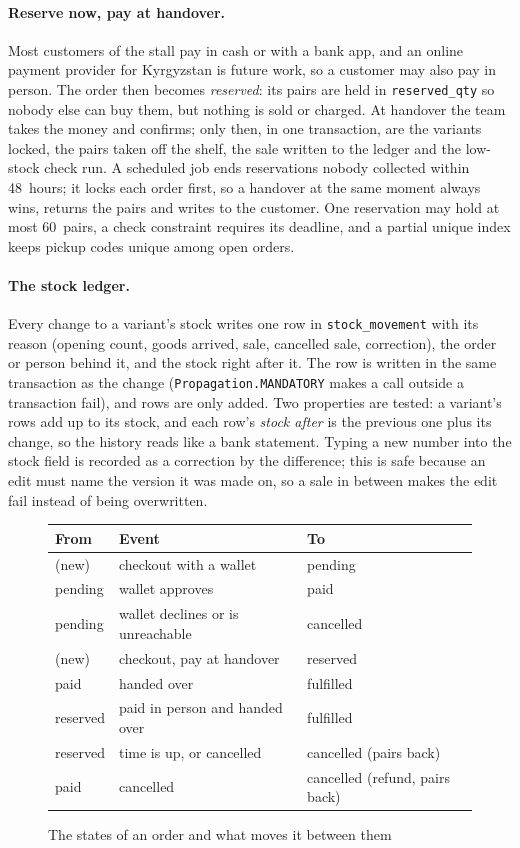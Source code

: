 \paragraph{Reserve now, pay at handover.} Most customers of the stall pay in cash or with a bank app, and an online
payment provider for Kyrgyzstan is future work, so a customer may also pay in person. The order then becomes
\emph{reserved}: its pairs are held in \texttt{reserved\_qty} so nobody else can buy them, but nothing is sold or
charged. At handover the team takes the money and confirms; only then, in one transaction, are the variants locked,
the pairs taken off the shelf, the sale written to the ledger and the low-stock check run. A scheduled job ends
reservations nobody collected within 48~hours; it locks each order first, so a handover at the same moment always wins,
returns the pairs and writes to the customer. One reservation may hold at most 60~pairs, a check constraint requires
its deadline, and a partial unique index keeps pickup codes unique among open orders.

\paragraph{The stock ledger.} Every change to a variant's stock writes one row in \texttt{stock\_movement} with its
reason (opening count, goods arrived, sale, cancelled sale, correction), the order or person behind it, and the stock
right after it. The row is written in the same transaction as the change (\texttt{Propagation.MANDATORY} makes a call
outside a transaction fail), and rows are only added. Two properties are tested: a variant's rows add up to its stock,
and each row's \emph{stock after} is the previous one plus its change, so the history reads like a bank statement.
Typing a new number into the stock field is recorded as a correction by the difference; this is safe because an edit
must name the version it was made on, so a sale in between makes the edit fail instead of being overwritten.

\begin{figure}[!htbp]
	\centering
	\begin{tabular}{lll}
		\toprule
		From & Event & To \\
		\midrule
		(new) & checkout with a wallet & pending \\
		pending & wallet approves & paid \\
		pending & wallet declines or is unreachable & cancelled \\
		(new) & checkout, pay at handover & reserved \\
		paid & handed over & fulfilled \\
		reserved & paid in person and handed over & fulfilled \\
		reserved & time is up, or cancelled & cancelled (pairs back) \\
		paid & cancelled & cancelled (refund, pairs back) \\
		\bottomrule
	\end{tabular}
	\caption{The states of an order and what moves it between them}
	\label{fig:orderstates}
\end{figure}

